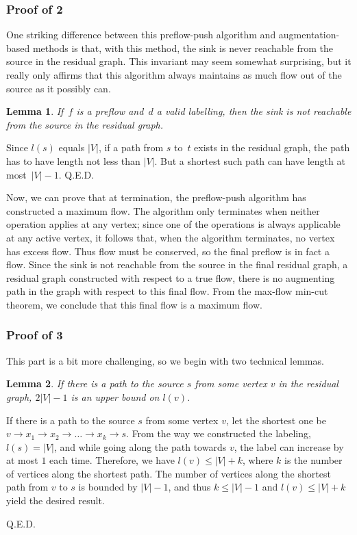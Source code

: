 \documentclass{article}
\newtheorem{lemma}{Lemma}
\newcommand{\QED}{\hfill\hbox{\sf Q.E.D.}}
\newenvironment{proof}{\noindent {\bf Proof:}}{{\QED}\\ \vspace{-.1in}}
\begin{document}
\subsubsection*{Proof of 2}
One striking difference between this preflow-push algorithm and
aug\-men\-ta\-tion-based methods is that, with this method, the sink
is never reachable from the source in the residual graph.
This invariant may seem
somewhat surprising, but it really only affirms that this algorithm always
maintains as much flow out of the source as it possibly can.
\begin{lemma}
  If~$f$ is a preflow and~$d$ a valid labelling, then the sink is not
  reachable from the source in the residual graph.
\end{lemma}
\begin{proof}
  Since $l(s)$ equals $|V|$,
  if a path from $s$ to~$t$ exists in the residual graph, 
   the path has to have length not less than $|V|$.  But a shortest such path can have length at most~$|V|-1$.
\end{proof}

Now, we can prove that at termination, the preflow-push algorithm has constructed a maximum flow.
  The algorithm only terminates when neither operation applies at any
  vertex; since one of the operations is always applicable at any active
  vertex, it follows that, when the algorithm terminates, no vertex has
  excess flow.  Thus flow must be conserved,
  so the final preflow is in fact a flow.  Since the sink is not
  reachable from the source in the final residual graph, a residual graph
  constructed with respect to a true flow, there is no augmenting path
  in the graph with respect to this final flow.  From the max-flow min-cut
  theorem, we conclude that this final flow is a maximum
  flow.

\subsubsection*{Proof of 3}
This part is a bit more challenging, so we begin with two technical lemmas.
\begin{lemma}
  If there is a path to the source $s$ from some vertex $v$ in the residual graph, 
$2|V|-1$ is an upper bound on $l(v)$.
\end{lemma}
\begin{proof}
  If there is a path to the source $s$ from some vertex $v$, let the shortest one be
  $v \to x_1 \to x_2 \to \ldots \to x_k \to s$. From the way we constructed the
  labeling, $l(s) = |V| $, and while going along the path towards $v$, the label
  can increase by at most $1$ each time. Therefore, we have $l(v) \leq |V| + k$, 
where $k$ is the number of vertices along the shortest path. 
The number of vertices along the shortest path from $v$ to $s$ is bounded by $|V| - 1$, 
and thus $k \leq |V| - 1$ and $l(v) \leq |V| + k$ yield the desired result.

\end{proof}
\relax
\end{document}
